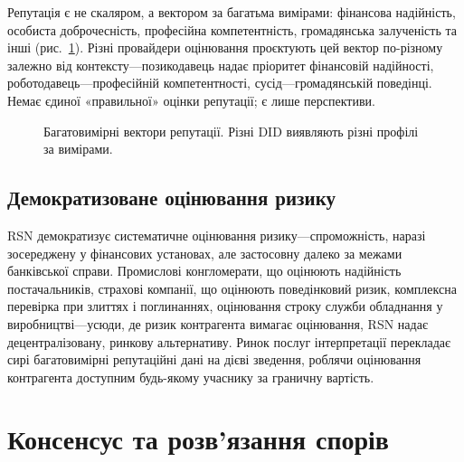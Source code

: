 \documentclass[11pt,a4paper,twocolumn]{article}
\begin{document}
Репутація є не скаляром, а вектором за багатьма вимірами: фінансова надійність, особиста доброчесність, професійна компетентність, громадянська залученість та інші (рис.~\ref{fig:reputation-radar}). Різні провайдери оцінювання проєктують цей вектор по-різному залежно від контексту---позикодавець надає пріоритет фінансовій надійності, роботодавець---професійній компетентності, сусід---громадянській поведінці. Немає єдиної «правильної» оцінки репутації; є лише перспективи.

\begin{figure}[ht]
\centering
{}
\caption{Багатовимірні вектори репутації. Різні DID виявляють різні профілі за вимірами.}
\label{fig:reputation-radar}
\end{figure}

\subsection{Демократизоване оцінювання ризику}

RSN демократизує систематичне оцінювання ризику---спроможність, наразі зосереджену у фінансових установах, але застосовну далеко за межами банківської справи. Промислові конгломерати, що оцінюють надійність постачальників, страхові компанії, що оцінюють поведінковий ризик, комплексна перевірка при злиттях і поглинаннях, оцінювання строку служби обладнання у виробництві---усюди, де ризик контрагента вимагає оцінювання, RSN надає децентралізовану, ринкову альтернативу. Ринок послуг інтерпретації перекладає сирі багатовимірні репутаційні дані на дієві зведення, роблячи оцінювання контрагента доступним будь-якому учаснику за граничну вартість.

\section{Консенсус та розв'язання спорів}
\end{document}
